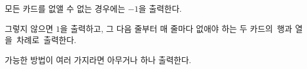 모든 카드를 없앨 수 없는 경우에는 $-1$을 출력한다.

그렇지 않으면 $1$을 출력하고, 그 다음 줄부터 매 줄마다 없애야 하는 두 카드의 행과 열을 차례로 출력한다.

가능한 방법이 여러 가지라면 아무거나 하나 출력한다.
